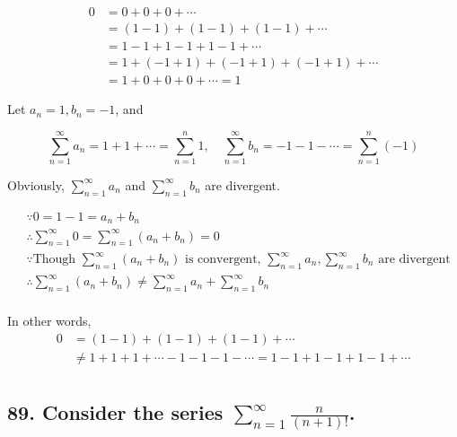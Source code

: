 \documentclass{article}
\begin{document}
    $$\begin{aligned}
        0 &= 0 + 0 + 0 + \cdots \\
        &= (1 - 1) + (1 - 1) + (1 - 1) + \cdots \\
        &= 1 - 1 + 1 - 1 + 1 - 1 + \cdots \\
        &= 1 + (-1 + 1) + (-1 + 1) + (-1 + 1) + \cdots \\
        &= 1 + 0 + 0 + 0 + \cdots = 1
    \end{aligned}$$

    Let $a_n = 1, b_n = -1$, and

    $$\sum_{n=1}^\infty a_n = 1 + 1 + \cdots = \sum_{n=1}^n 1, \quad \sum_{n=1}^\infty b_n = -1 - 1 - \cdots = \sum_{n=1}^n(-1)$$

    Obviously, $\sum_{n=1}^\infty a_n$ and $\sum_{n=1}^\infty b_n$ are divergent.

    $$\begin{aligned}
        &\because 0 = 1 - 1 = a_n + b_n \\
        &\therefore \sum_{n=1}^\infty 0 = \sum_{n=1}^\infty (a_n + b_n) = 0 \\
        &\because \textrm{Though } \sum_{n=1}^\infty(a_n + b_n)\textrm{ is convergent, }\sum_{n=1}^\infty a_n, \sum_{n=1}^\infty b_n\textrm{ are divergent} \\
        &\therefore \sum_{n=1}^\infty(a_n + b_n) \not = \sum_{n=1}^\infty a_n + \sum_{n=1}^\infty b_n \\
    \end{aligned}$$


    In other words, $$$$
    $$\begin{aligned}
        0 &= (1-1)+(1-1)+(1-1)+\cdots \\
        &\not = 1+1+1+\cdots-1-1-1-\cdots =1-1+1-1+1-1+\cdots \\
    \end{aligned}$$




    \subsection*{89. Consider the series $\sum_{n=1}^\infty \frac{n}{(n+1)!}$.}
\end{document}

